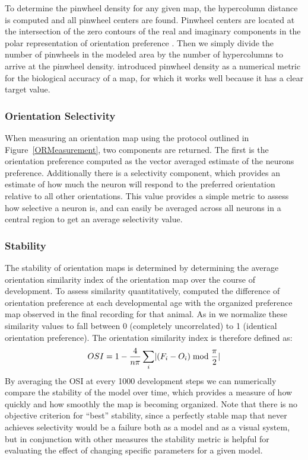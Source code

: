 To determine the pinwheel density for any given map, the hypercolumn
distance is computed and all pinwheel centers are found. Pinwheel
centers are located at the intersection of the zero contours of the
real and imaginary components in the polar representation of
orientation preference \citep{Lowel1998}. Then we simply divide the
number of pinwheels in the modeled area by the number of hypercolumns
to arrive at the pinwheel density.  \cite{Stevens2013} introduced
pinwheel density as a numerical metric for the biological accuracy of
a map, for which it works well because it has a clear target value.

\subsubsection*{Orientation Selectivity}

When measuring an orientation map using the protocol outlined in
Figure~\ref{ORMeasurement}, two components are returned. The first is
the orientation preference computed as the vector averaged estimate of
the neurons preference. Additionally there is a selectivity component,
which provides an estimate of how much the neuron will respond to the
preferred orientation relative to all other orientations. This value
provides a simple metric to assess how selective a neuron is, and can
easily be averaged across all neurons in a central region to get an
average selectivity value.

\subsubsection*{Stability}

The stability of orientation maps is determined by determining the
average orientation similarity index of the orientation map over the
course of development. To assess similarity quantitatively,
\cite{Chapman1996} computed the difference of orientation preference
at each developmental age with the organized preference map observed
in the final recording for that animal. As in \cite{Stevens2013} we
normalize these similarity values to fall between 0 (completely
uncorrelated) to 1 (identical orientation preference). The orientation
similarity index is therefore defined as:
\begin{equation}
  OSI = 1 - \frac{4}{n\pi} \sum_{i}\lvert(F_{i}-O_{i})\bmod\frac{\pi}{2}\rvert
\end{equation}
By averaging the OSI at every 1000 development steps we can
numerically compare the stability of the model over time, which
provides a measure of how quickly and how smoothly the map is becoming
organized. Note that there is no objective criterion for ``best''
stability, since a perfectly stable map that never achieves
selectivity would be a failure both as a model and as a visual system,
but in conjunction with other measures the stability metric is helpful
for evaluating the effect of changing specific parameters for a given
model.

